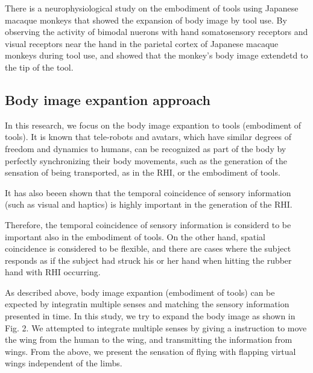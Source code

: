 \documentclass[letterpaper, 10 pt, conference]{ieeeconf}  %
\begin{document}
                There is a neurophysiological study on the embodiment of tools using Japanese macaque monkeys that showed the expansion of body image by tool use.  
                By observing the activity of bimodal nuerons with hand somatosensory receptors and visual receptors near the hand in the parietal cortex of Japanese macaque monkeys during tool use, and showed that the monkey's body image extendetd to the tip of the tool\cite{iriki1996coding}.
                
        \subsection{Body image expantion approach}
                In this research, we focus on the body image expantion to tools (embodiment of tools).
                It is known that tele-robots and avatars, which have similar degrees of freedom and dynamics to humans, can be recognized as part of the body by perfectly synchronizing their body movements, such as the generation of the sensation of being transported, as in the RHI, or the embodiment of tools.
                
                It has also beeen shown that the temporal coincidence of sensory information (such as visual and haptics) is highly important in the generation of the RHI\cite{ehrsson2007experimental}.  
                
                Therefore, the temporal coincidence of sensory information is considerd to be important also in the embodiment of tools.  
                On the other hand, spatial coincidence is considered to be flexible, and there are cases where the subject responds as if the subject had struck his or her hand when hitting the rubber hand with RHI occurring\cite{armel2003projecting}.  


                As described above, body image expantion (embodiment of tools) can be expected by integratin multiple senses and matching the sensory information presented in time.  
                In this study, we try to expand the body image as shown in Fig. 2.  
                We attempted to integrate multiple senses by giving a instruction to move the wing from the human to the wing, and transmitting 
                the information from wings.
                From the above, we present the sensation of flying with flapping virtual wings independent of the limbs.
\end{document}
